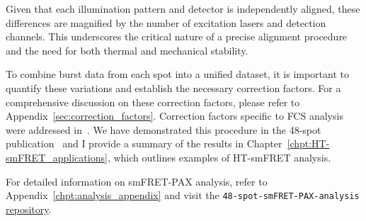 Given that each illumination pattern and detector is independently aligned, these differences are magnified by the number of excitation lasers and detection channels. 
This underscores the critical nature of a precise alignment procedure and the need for both thermal and mechanical stability.

To combine burst data from each spot into a unified dataset, it is important to quantify these variations and establish the necessary correction factors. 
For a comprehensive discussion on these correction factors, please refer to Appendix~\ref{sec:correction_factors}. 
Correction factors specific to \ac{FCS} analysis were addressed in~\cite{colyer_BOE_2010}. 
We have demonstrated this procedure in the 48-spot publication~\cite{ingargiola_JCP_2018} and I provide a summary of the results in Chapter~\ref{chpt:HT-smFRET_applications}, which outlines examples of \ac{HT-smFRET} analysis.

For detailed information on smFRET-PAX analysis, refer to Appendix~\ref{chpt:analysis_appendix} and visit the \texttt{48-spot-smFRET-PAX-analysis} \href{https://github.com/tritemio/48-spot-smFRET-PAX-analysis}{repository}.

